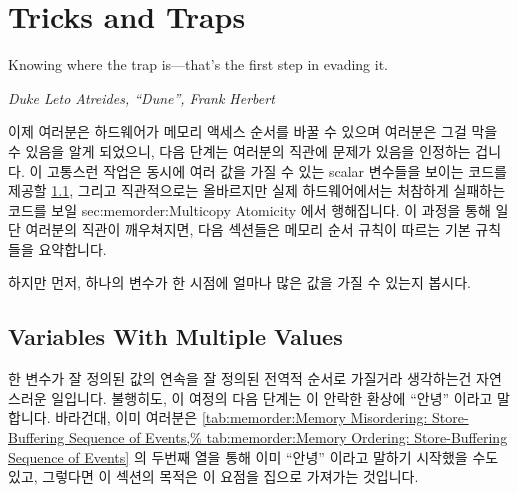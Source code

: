 \section{Tricks and Traps}
\label{sec:memorder:Tricks and Traps}
%
\epigraph{Knowing where the trap is---that's the first step in evading it.}
	 {\emph{Duke Leto Atreides, ``Dune'', Frank Herbert}}

이제 여러분은 하드웨어가 메모리 액세스 순서를 바꿀 수 있으며 여러분은 그걸 막을
수 있음을 알게 되었으니, 다음 단계는 여러분의 직관에 문제가 있음을 인정하는
겁니다.
이 고통스런 작업은 동시에 여러 값을 가질 수 있는 scalar 변수들을 보이는 코드를
제공할
\cref{sec:memorder:Variables With Multiple Values}, 그리고
직관적으로는 올바르지만 실제 하드웨어에서는 처참하게 실패하는 코드를 보일
{sec:memorder:Multicopy Atomicity} 에서 행해집니다.
이 과정을 통해 일단 여러분의 직관이 깨우쳐지면, 다음 섹션들은 메모리 순서
규칙이 따르는 기본 규칙들을 요약합니다.

하지만 먼저, 하나의 변수가 한 시점에 얼마나 많은 값을 가질 수 있는지 봅시다.

\subsection{Variables With Multiple Values}
\label{sec:memorder:Variables With Multiple Values}

한 변수가 잘 정의된 값의 연속을 잘 정의된 전역적 순서로 가질거라 생각하는건
자연스러운 일입니다.
불행히도, 이 여정의 다음 단계는 이 안락한 환상에 ``안녕'' 이라고 말합니다.
바라건대, 이미 여러분은
\cref{tab:memorder:Memory Misordering: Store-Buffering Sequence of Events,%
tab:memorder:Memory Ordering: Store-Buffering Sequence of Events} 의 두번째
열을 통해 이미 ``안녕'' 이라고 말하기 시작했을 수도 있고, 그렇다면 이 섹션의
목적은 이 요점을 집으로 가져가는 것입니다.

